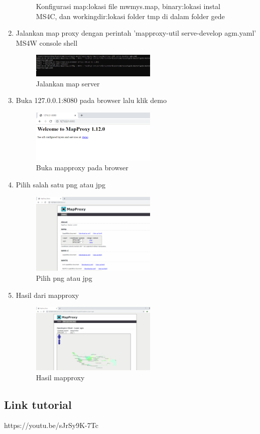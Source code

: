 \begin{enumerate}
\begin{figure}[H]
			\centering
			\caption{Konfigurasi map:lokasi file mwmys.map, binary:lokasi instal MS4C, dan workingdir:lokasi folder tmp di dalam folder gede }
		\end{figure}
	\item Jalankan map proxy dengan perintah 'mapproxy-util serve-develop agm.yaml' MS4W console shell
		\begin{figure}[H]
			\includegraphics[width=6cm]{figures/Tugas4/1174071/13.png}
			\centering
			\caption{Jalankan map server}
		\end{figure}
	\item Buka 127.0.0.1:8080 pada browser lalu klik demo
		\begin{figure}[H]
			\includegraphics[width=6cm]{figures/Tugas4/1174071/14.png}
			\centering
			\caption{Buka mapproxy pada browser}
		\end{figure}
	\item Pilih salah satu png atau jpg
		\begin{figure}[H]
			\includegraphics[width=6cm]{figures/Tugas4/1174071/15.png}
			\centering
			\caption{Pilih png atau jpg}
		\end{figure}
	\item Hasil dari mapproxy
		\begin{figure}[H]
			\includegraphics[width=6cm]{figures/Tugas4/1174071/16.png}
			\centering
			\caption{Hasil mapproxy}
		\end{figure}
\end{enumerate}


\subsection{Link tutorial}
https://youtu.be/sJrSy9K-7Tc
